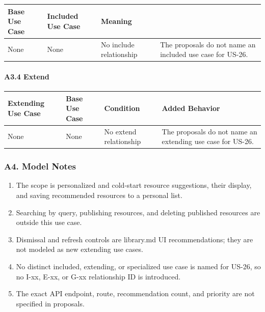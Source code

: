 \documentclass[12pt]{article}
\renewcommand{\baselinestretch}{1.5}
\begin{document}
\begingroup
\small
\renewcommand{\baselinestretch}{1.0}\selectfont
\renewcommand{\arraystretch}{1.15}
\setlength{\tabcolsep}{6pt}
\begin{longtable}{|>{\raggedright\arraybackslash}p{}|>{\raggedright\arraybackslash}p{}|>{\raggedright\arraybackslash}p{}|}
\hline
\textbf{Base Use Case} & \textbf{Included Use Case} & \textbf{Meaning} \\ \hline
\endhead
None & None & No include relationship & The proposals do not name an included use case for US-26. \\ \hline
\end{longtable}
\endgroup
\par\medskip

\hypertarget{sec:a3-4-extend}{}
\paragraph*{A3.4 Extend}
\par\medskip

\begingroup
\small
\renewcommand{\baselinestretch}{1.0}\selectfont
\renewcommand{\arraystretch}{1.15}
\setlength{\tabcolsep}{6pt}
\begin{longtable}{|>{\raggedright\arraybackslash}p{}|>{\raggedright\arraybackslash}p{}|>{\raggedright\arraybackslash}p{}|>{\raggedright\arraybackslash}p{}|}
\hline
\textbf{Extending Use Case} & \textbf{Base Use Case} & \textbf{Condition} & \textbf{Added Behavior} \\ \hline
\endhead
None & None & No extend relationship & The proposals do not name an extending use case for US-26. \\ \hline
\end{longtable}
\endgroup
\par\medskip

\hypertarget{sec:a4-model-notes}{}
\subsubsection*{A4. Model Notes}
\par\medskip

\begin{enumerate}
\item The scope is personalized and cold-start resource suggestions, their display, and saving recommended resources to a personal list.
\item Searching by query, publishing resources, and deleting published resources are outside this use case.
\item Dismissal and refresh controls are library.md UI recommendations; they are not modeled as new extending use cases.
\item No distinct included, extending, or specialized use case is named for US-26, so no I-xx, E-xx, or G-xx relationship ID is introduced.
\item The exact API endpoint, route, recommendation count, and priority are not specified in proposals.
\end{enumerate}
\par\medskip
\end{document}
